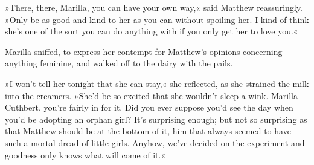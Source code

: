»There, there, Marilla, you can have your own way,« said Matthew reassuringly. »Only be as good and kind to her as you can without spoiling her. I kind of think she’s one of the sort you can do anything with if you only get her to love you.«

Marilla sniffed, to express her contempt for Matthew’s opinions concerning anything feminine, and walked off to the dairy with the pails.

»I won’t tell her tonight that she can stay,« she reflected, as she strained the milk into the creamers. »She’d be so excited that she wouldn’t sleep a wink. Marilla Cuthbert, you’re fairly in for it. Did you ever suppose you’d see the day when you’d be adopting an orphan girl? It’s surprising enough; but not so surprising as that Matthew should be at the bottom of it, him that always seemed to have such a mortal dread of little girls. Anyhow, we’ve decided on the experiment and goodness only knows what will come of it.«